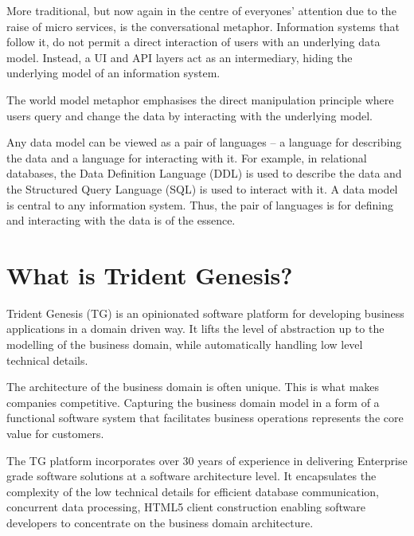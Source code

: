 \documentclass[a4paper,12pt,oneside,openright,final]{memoir} %
\begin{document}
	More traditional, but now again in the centre of everyones' attention due to the raise of micro services, is the conversational metaphor.
	Information systems that follow it, do not permit a direct interaction of users with an underlying data model.
	Instead, a UI and API layers act as an intermediary, hiding the underlying model of an information system.
	
	The world model metaphor emphasises the direct manipulation principle where users query and change the data by interacting with the underlying model.
	
	Any data model can be viewed as a pair of languages -- a language for describing the data and a language for interacting with it.
	For example, in relational databases, the Data Definition Language (DDL) is used to describe the data and the Structured Query Language (SQL) is used to interact with it.
	A data model is central to any information system.
	Thus, the pair of languages is for defining and interacting with the data is of the essence.



\section*{What is Trident Genesis?}
  Trident Genesis (TG) is an opinionated software platform for developing business applications in a domain driven way.
  It lifts the level of abstraction up to the modelling of the business domain, while automatically handling low level technical details.
  
  \vspace{3 mm}
  \noindent The architecture of the business domain is often unique. 
  This is what makes companies competitive.
  Capturing the business domain model in a form of a functional software system that facilitates business operations represents the core value for customers.
  
  \vspace{3 mm}
  \noindent The TG platform incorporates over 30 years of experience in delivering Enterprise grade software solutions at a software architecture level.
  It encapsulates the complexity of the low technical details for efficient database communication, concurrent data processing, HTML5 client construction enabling software developers to concentrate on the business domain architecture.
\end{document}
